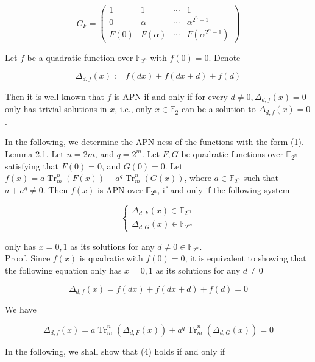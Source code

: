 \documentclass[10pt]{article}
\begin{document}
$$
C_{F}=\left(\begin{array}{cccc}
1 & 1 & \cdots & 1 \\
0 & \alpha & \cdots & \alpha^{2^{n}-1} \\
F(0) & F(\alpha) & \cdots & F\left(\alpha^{2^{n}-1}\right)
\end{array}\right)
$$

Let $f$ be a quadratic function over $\mathbb{F}_{2^{n}}$ with $f(0)=0$. Denote

$$
\Delta_{d, f}(x):=f(d x)+f(d x+d)+f(d)
$$

Then it is well known that $f$ is APN if and only if for every $d \neq 0, \Delta_{d, f}(x)=0$ only has trivial solutions in $x$, i.e., only $x \in \mathbb{F}_{2}$ can be a solution to $\Delta_{d, f}(x)=0$.

In the following, we determine the APN-ness of the functions with the form (1).\\
Lemma 2.1. Let $n=2 m$, and $q=2^{m}$. Let $F, G$ be quadratic functions over $\mathbb{F}_{2^{n}}$ satisfying that $F(0)=0$, and $G(0)=0$. Let $f(x)=a \operatorname{Tr}_{m}^{n}(F(x))+a^{q} \operatorname{Tr}_{m}^{n}(G(x))$, where $a \in \mathbb{F}_{2^{n}}$ such that $a+a^{q} \neq 0$. Then $f(x)$ is APN over $\mathbb{F}_{2^{n}}$, if and only if the following system

\[
\left\{\begin{array}{l}
\Delta_{d, F}(x) \in \mathbb{F}_{2^{m}}  \tag{2}\\
\Delta_{d, G}(x) \in \mathbb{F}_{2^{m}}
\end{array}\right.
\]

only has $x=0,1$ as its solutions for any $d \neq 0 \in \mathbb{F}_{2^{n}}$.\\
Proof. Since $f(x)$ is quadratic with $f(0)=0$, it is equivalent to showing that the following equation only has $x=0,1$ as its solutions for any $d \neq 0$


\begin{equation*}
\Delta_{d, f}(x)=f(d x)+f(d x+d)+f(d)=0 \tag{3}
\end{equation*}


We have


\begin{equation*}
\Delta_{d, f}(x)=a \operatorname{Tr}_{m}^{n}\left(\Delta_{d, F}(x)\right)+a^{q} \operatorname{Tr}_{m}^{n}\left(\Delta_{d, G}(x)\right)=0 \tag{4}
\end{equation*}


In the following, we shall show that (4) holds if and only if
\end{document}
